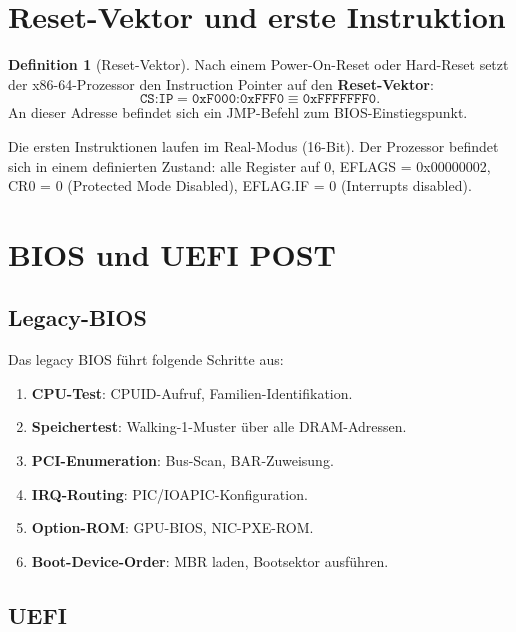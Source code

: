﻿\documentclass[a4paper,12pt]{scrreprt}
\theoremstyle{definition}
\newtheorem{definition}{Definition}[chapter]
\begin{document}
	\section{Reset-Vektor und erste Instruktion}
	
	\begin{definition}[Reset-Vektor]
		Nach einem Power-On-Reset oder Hard-Reset setzt der x86-64-Prozessor den
		Instruction Pointer auf den \textbf{Reset-Vektor}:
		\[
		\texttt{CS:IP} = \texttt{0xF000:0xFFF0} \equiv \texttt{0xFFFFFFF0}.
		\]
		An dieser Adresse befindet sich ein JMP-Befehl zum BIOS-Einstiegspunkt.
	\end{definition}
	
	Die ersten Instruktionen laufen im Real-Modus (16-Bit). Der Prozessor befindet
	sich in einem definierten Zustand: alle Register auf 0, EFLAGS = 0x00000002,
	CR0 = 0 (Protected Mode Disabled), EFLAG.IF = 0 (Interrupts disabled).
	
	\section{BIOS und UEFI POST}
	
	\subsection{Legacy-BIOS}
	
	Das legacy BIOS führt folgende Schritte aus:
	\begin{enumerate}
		\item \textbf{CPU-Test}: CPUID-Aufruf, Familien-Identifikation.
		\item \textbf{Speichertest}: Walking-1-Muster über alle DRAM-Adressen.
		\item \textbf{PCI-Enumeration}: Bus-Scan, BAR-Zuweisung.
		\item \textbf{IRQ-Routing}: PIC/IOAPIC-Konfiguration.
		\item \textbf{Option-ROM}: GPU-BIOS, NIC-PXE-ROM.
		\item \textbf{Boot-Device-Order}: MBR laden, Bootsektor ausführen.
	\end{enumerate}
	
	\subsection{UEFI}
\end{document}
